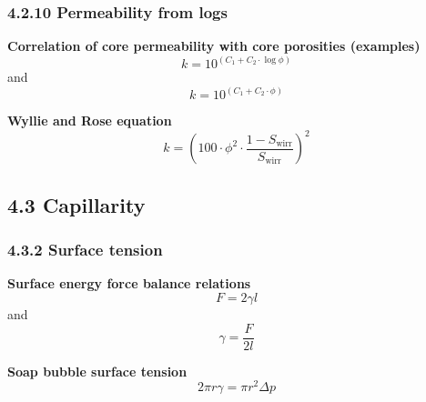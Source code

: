 \subsubsection{4.2.10 Permeability from logs}
\textbf{Correlation of core permeability with core porosities (examples)}
\begin{equation*}
    k = 10^{(C_1 + C_2\cdot\log\phi)}\tag{4.22}
\end{equation*}
and
\begin{equation*}
    k = 10^{(C_1 + C_2\cdot\phi)}\tag{4.23}
\end{equation*}

\textbf{Wyllie and Rose equation}
\begin{equation*}
    k = \left(100\cdot\phi^2\cdot\frac{1 - S_\mathrm{wirr}}{S_\mathrm{wirr}}\right)^2\tag{4.24}
\end{equation*}

\subsection{4.3 Capillarity}
\subsubsection{4.3.2 Surface tension}
\textbf{Surface energy force balance relations}
\begin{equation*}
    F = 2 \gamma l\tag{4.25}
\end{equation*}
and
\begin{equation*}
    \gamma = \frac{F}{2 l}\tag{4.26}
\end{equation*}

\textbf{Soap bubble surface tension}
\begin{equation*}
    2\pi r\gamma = \pi r^2\Delta p\tag{4.27}
\end{equation*}

